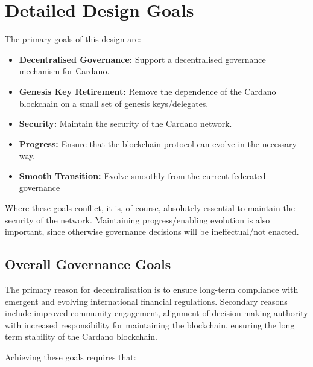 \section{Detailed Design Goals}

The primary goals of this design are:

\begin{itemize}
\item
  \textbf{Decentralised Governance:}
  Support a decentralised governance mechanism for Cardano.
\item
  \textbf{Genesis Key Retirement:}
  Remove the dependence of the Cardano blockchain on a small set of genesis keys/delegates.
\item
  \textbf{Security:}
  Maintain the security of the Cardano network.
\item
  \textbf{Progress:}
  Ensure that the blockchain protocol can evolve in the necessary way.
\item
  \textbf{Smooth Transition:}
  Evolve smoothly from the current federated governance
\end{itemize}

Where these goals conflict, it is, of course, absolutely essential to maintain the security of the network.  Maintaining progress/enabling
evolution is also important, since otherwise governance decisions will be ineffectual/not enacted.

\subsection{Overall Governance Goals}

The primary reason for decentralisation is to ensure long-term compliance with emergent and evolving international financial regulations.
Secondary reasons include improved community engagement, alignment of decision-making authority with increased responsibility for maintaining the blockchain,
ensuring the long term stability of the Cardano blockchain.

Achieving these goals requires that:

